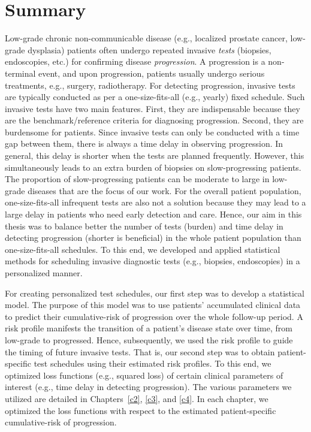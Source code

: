 \section{Summary}
Low-grade chronic non-communicable disease (e.g., localized prostate cancer, low-grade dysplasia) patients often undergo repeated invasive \emph{tests} (biopsies, endoscopies, etc.) for confirming disease \emph{progression}. A progression is a non-terminal event, and upon progression, patients usually undergo serious treatments, e.g., surgery, radiotherapy. For detecting progression, invasive tests are typically conducted as per a one-size-fits-all (e.g., yearly) fixed schedule. Such invasive tests have two main features. First, they are indispensable because they are the benchmark/reference criteria for diagnosing progression. Second, they are burdensome for patients. Since invasive tests can only be conducted with a time gap between them, there is always a time delay in observing progression. In general, this delay is shorter when the tests are planned frequently. However, this simultaneously leads to an extra burden of biopsies on slow-progressing patients. The proportion of slow-progressing patients can be moderate to large in low-grade diseases that are the focus of our work. For the overall patient population, one-size-fits-all infrequent tests are also not a solution because they may lead to a large delay in patients who need early detection and care. Hence, our aim in this thesis was to balance better the number of tests (burden) and time delay in detecting progression (shorter is beneficial) in the whole patient population than one-size-fits-all schedules. To this end, we developed and applied statistical methods for scheduling invasive diagnostic tests (e.g., biopsies, endoscopies) in a personalized manner.

For creating personalized test schedules, our first step was to develop a statistical model. The purpose of this model was to use patients' accumulated clinical data to predict their cumulative-risk of progression over the whole follow-up period. A risk profile manifests the transition of a patient's disease state over time, from low-grade to progressed. Hence, subsequently, we used the risk profile to guide the timing of future invasive tests. That is, our second step was to obtain patient-specific test schedules using their estimated risk profiles. To this end, we optimized loss functions (e.g., squared loss) of certain clinical parameters of interest (e.g., time delay in detecting progression). The various parameters we utilized are detailed in Chapters~\ref{c2}, \ref{c3}, and \ref{c4}. In each chapter, we optimized the loss functions with respect to the estimated patient-specific cumulative-risk of progression.

